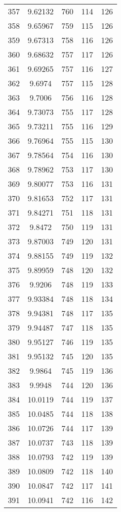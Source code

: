 \documentclass[12pt,a4paper]{article}
\begin{document}
\begin{tabular}{r|cccc}
	357 & 9.62132 & 760 & 114 & 126 \\
	358 & 9.65967 & 759 & 115 & 126 \\
	359 & 9.67313 & 758 & 116 & 126 \\
	360 & 9.68632 & 757 & 117 & 126 \\
	361 & 9.69265 & 757 & 116 & 127 \\
	362 & 9.6974 & 757 & 115 & 128 \\
	363 & 9.7006 & 756 & 116 & 128 \\
	364 & 9.73073 & 755 & 117 & 128 \\
	365 & 9.73211 & 755 & 116 & 129 \\
	366 & 9.76964 & 755 & 115 & 130 \\
	367 & 9.78564 & 754 & 116 & 130 \\
	368 & 9.78962 & 753 & 117 & 130 \\
	369 & 9.80077 & 753 & 116 & 131 \\
	370 & 9.81653 & 752 & 117 & 131 \\
	371 & 9.84271 & 751 & 118 & 131 \\
	372 & 9.8472 & 750 & 119 & 131 \\
	373 & 9.87003 & 749 & 120 & 131 \\
	374 & 9.88155 & 749 & 119 & 132 \\
	375 & 9.89959 & 748 & 120 & 132 \\
	376 & 9.9206 & 748 & 119 & 133 \\
	377 & 9.93384 & 748 & 118 & 134 \\
	378 & 9.94381 & 748 & 117 & 135 \\
	379 & 9.94487 & 747 & 118 & 135 \\
	380 & 9.95127 & 746 & 119 & 135 \\
	381 & 9.95132 & 745 & 120 & 135 \\
	382 & 9.9864 & 745 & 119 & 136 \\
	383 & 9.9948 & 744 & 120 & 136 \\
	384 & 10.0119 & 744 & 119 & 137 \\
	385 & 10.0485 & 744 & 118 & 138 \\
	386 & 10.0726 & 744 & 117 & 139 \\
	387 & 10.0737 & 743 & 118 & 139 \\
	388 & 10.0793 & 742 & 119 & 139 \\
	389 & 10.0809 & 742 & 118 & 140 \\
	390 & 10.0847 & 742 & 117 & 141 \\
	391 & 10.0941 & 742 & 116 & 142 \\

\end{tabular}
\end{document}
